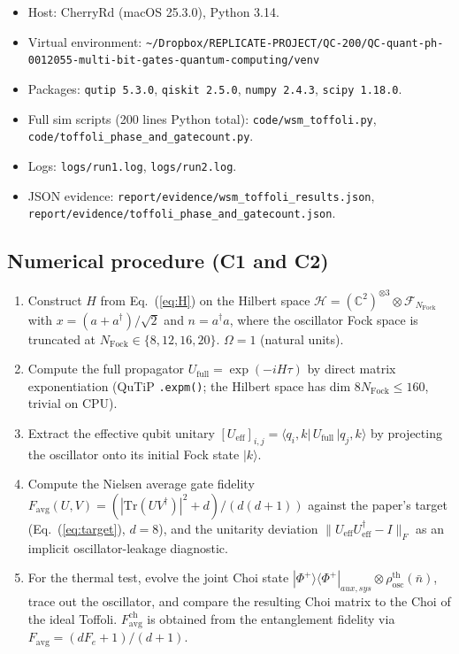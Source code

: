 \documentclass[11pt]{article}
\begin{document}
\begin{itemize}
\item Host: CherryRd (macOS 25.3.0), Python 3.14.
\item Virtual environment: \verb|~/Dropbox/REPLICATE-PROJECT/QC-200/QC-quant-ph-0012055-multi-bit-gates-quantum-computing/venv|
\item Packages: \verb|qutip 5.3.0|, \verb|qiskit 2.5.0|, \verb|numpy 2.4.3|, \verb|scipy 1.18.0|.
\item Full sim scripts (200 lines Python total):
      \verb|code/wsm_toffoli.py|, \verb|code/toffoli_phase_and_gatecount.py|.
\item Logs: \verb|logs/run1.log|, \verb|logs/run2.log|.
\item JSON evidence: \verb|report/evidence/wsm_toffoli_results.json|,
                    \verb|report/evidence/toffoli_phase_and_gatecount.json|.
\end{itemize}

\subsection*{Numerical procedure (C1 and C2)}

\begin{enumerate}
\item Construct $H$ from Eq.~(\ref{eq:H}) on the Hilbert space
      $\mathcal H = (\mathbb C^2)^{\otimes 3}\otimes \mathcal F_{N_\mathrm{Fock}}$
      with $x=(a+a^\dagger)/\sqrt 2$ and $n=a^\dagger a$, where the oscillator
      Fock space is truncated at $N_\mathrm{Fock} \in \{8,12,16,20\}$.
      $\Omega=1$ (natural units).
\item Compute the full propagator $U_\mathrm{full} = \exp(-i H \tau)$ by direct
      matrix exponentiation (QuTiP \verb|.expm()|; the Hilbert space has dim
      $8 N_\mathrm{Fock}\leq 160$, trivial on CPU).
\item Extract the effective qubit unitary
      $[U_\mathrm{eff}]_{i,j} = \langle q_i, k|\, U_\mathrm{full}\, |q_j, k\rangle$
      by projecting the oscillator onto its initial Fock state $|k\rangle$.
\item Compute the Nielsen average gate fidelity
      $F_\mathrm{avg}(U,V) = (|\mathrm{Tr}(UV^\dagger)|^2 + d)/(d(d+1))$
      against the paper's target (Eq.~(\ref{eq:target}), $d=8$), and the
      unitarity deviation $\|U_\mathrm{eff}U_\mathrm{eff}^\dagger - I\|_F$
      as an implicit oscillator-leakage diagnostic.
\item For the thermal test, evolve the joint Choi state
      $|\Phi^+\rangle\langle\Phi^+|_{aux,sys}\otimes \rho_\mathrm{osc}^\mathrm{th}(\bar n)$,
      trace out the oscillator, and compare the resulting Choi matrix to the
      Choi of the ideal Toffoli.  $F_\mathrm{avg}^\mathrm{ch}$ is obtained from
      the entanglement fidelity via
      $F_\mathrm{avg} = (dF_e + 1)/(d+1)$.
\end{enumerate}
\end{document}
